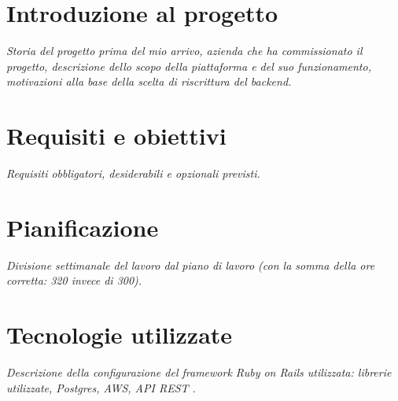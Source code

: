 \section{Introduzione al progetto}
\emph{Storia del progetto prima del mio arrivo, azienda che ha commissionato il progetto, descrizione dello scopo della piattaforma e del suo funzionamento, motivazioni alla base della scelta di riscrittura del backend.}

\section{Requisiti e obiettivi}
\emph{Requisiti obbligatori, desiderabili e opzionali previsti.}

\section{Pianificazione}
\emph{Divisione settimanale del lavoro dal piano di lavoro (con la somma della ore corretta: 320 invece di 300).}

\section{Tecnologie utilizzate}
\emph{Descrizione della configurazione del framework Ruby on Rails utilizzata: librerie utilizzate, Postgres, AWS, API REST .}
